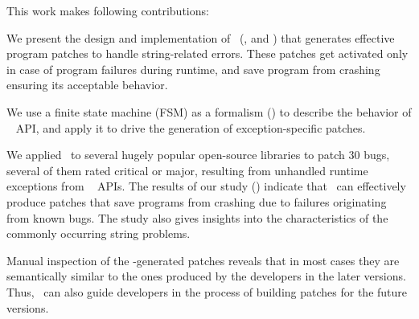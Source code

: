This work makes following contributions:
\begin{mylist}

\item We present the design and implementation of \tool\
(,  and ) that
 generates effective program patches to handle string-related errors. These 
patches get activated only in case of program failures during runtime, and save
program from crashing ensuring its acceptable behavior.



\item We use a finite state machine (FSM) as a formalism () to
describe the behavior of \java\ \code{String} API, and apply it to drive the
generation of exception-specific patches.

\item We applied \tool\ to several hugely popular open-source libraries to patch
$30$ bugs, several of them rated critical or major, resulting from unhandled
runtime exceptions from \java\ \code{String} APIs. The results of our study
(\xref{sec:results}) indicate that \tool\ can effectively produce patches that
save programs from crashing due to failures originating from known bugs. The
study also gives insights into the characteristics of the commonly occurring
string problems.

\item Manual inspection of the \tool-generated patches reveals that in most
cases they are semantically similar to the ones produced by the developers in
the later versions. %
Thus, \tool\ can also guide developers in the process of building patches for
the future versions.
\end{mylist}


